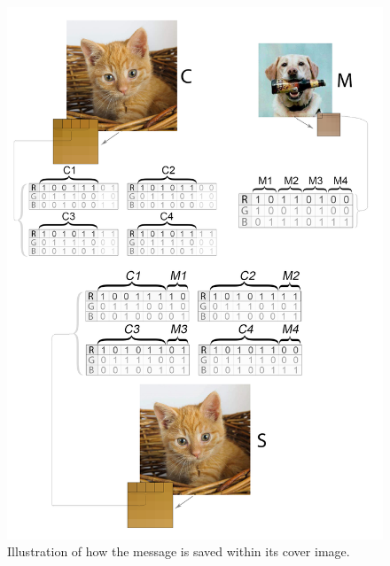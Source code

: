 \begin{figure}
		\centering
		\includegraphics[width=1.0\textwidth]{figures/hundikatgrafik.png}
		\caption{Illustration of how the message is saved within its cover image.}
	    \label{fig:hundigrafik2}
\end{figure}
